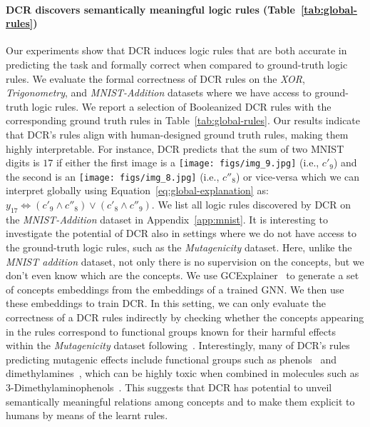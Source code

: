 \paragraph{DCR discovers semantically meaningful logic rules (Table~\ref{tab:global-rules})}
Our experiments show that DCR induces logic rules that are both accurate in predicting the task and formally correct when compared to ground-truth logic rules. We evaluate the formal correctness of DCR rules on the \emph{XOR}, \emph{Trigonometry}, and \emph{MNIST-Addition} datasets where we have access to ground-truth logic rules. We report a selection of Booleanized DCR rules with the corresponding ground truth rules in Table~\ref{tab:global-rules}. 
Our results indicate that DCR's rules align with human-designed ground truth rules, making them highly interpretable. For instance, DCR predicts that the sum of two MNIST digits is $17$ if either the first image is a \texttt{[image: figs/img\_9.jpg]} (i.e., $c'_9$) and the second is an \texttt{[image: figs/img\_8.jpg]} (i.e., $c''_8$) or vice-versa which we can interpret globally using Equation~\ref{eq:global-explanation} as: $y_{17} \Leftrightarrow (c'_9 \land  c''_8) \vee (c'_8 \land  c''_9)$. We list all logic rules discovered by DCR on the \emph{MNIST-Addition} dataset in Appendix~\ref{app:mnist}.
It is interesting to investigate the potential of DCR also in settings where we do not have access to the ground-truth logic rules, such as the \emph{Mutagenicity} dataset. Here, unlike the \textit{MNIST addition} dataset, not only
there is no supervision on the concepts, but we don't even know which are the concepts.
We use GCExplainer~\cite{magister2021gcexplainer} to generate a set of concepts embeddings from the embeddings of a trained GNN. We then use these embeddings to train DCR.
In this setting, we can only evaluate the correctness of a DCR rules indirectly by checking whether the concepts appearing in the rules correspond to functional groups known for their harmful effects within the \emph{Mutagenicity} dataset following~\citet{ying2019gnnexplainer}. Interestingly, many of DCR's rules predicting mutagenic effects include functional groups such as phenols~\cite{hattenschwiler2000role} and dimethylamines~\cite{acgih2016american}, which can be highly toxic when combined in molecules such as \mbox{3-Dimethylaminophenols}~\cite{sabry2011synthesis}. This suggests that DCR has potential to unveil semantically meaningful relations among concepts and to make them explicit to humans by means of the learnt rules. 
